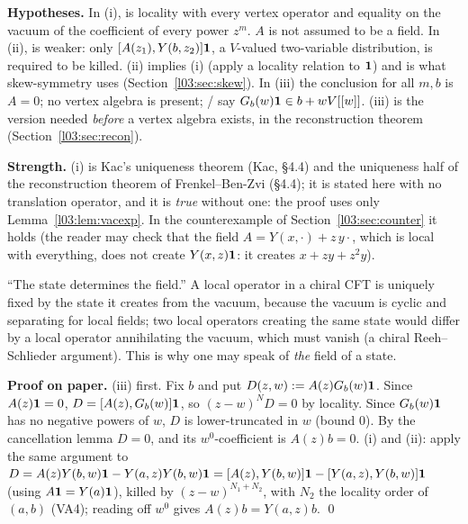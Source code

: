 \begin{dictionary}
\textbf{Hypotheses.} In (i),  is locality with every vertex operator and 
equality on the vacuum of the coefficient of every power $z^m$. $A$ is not assumed to be a field. In
(ii),  is weaker: only $[A(z_1),Y(b,z_2)]\mathbf{1}$, a $V$-valued two-variable distribution,
is required to be killed. (ii) implies (i) (apply a locality relation to $\mathbf{1}$) and is what
skew-symmetry uses (Section~\ref{l03:sec:skew}). In (iii) the conclusion  for all
$m,b$ is $A = 0$; no vertex algebra is present; / say $G_b(w)\mathbf{1}\in
b+wV[[w]]$. (iii) is the version needed \emph{before} a vertex algebra exists, in the reconstruction
theorem (Section~\ref{l03:sec:recon}).

\textbf{Strength.} (i) is Kac's uniqueness theorem (Kac, §4.4) and the uniqueness half of the
reconstruction theorem of Frenkel--Ben-Zvi (§4.4); it is stated here with no translation operator, and it is \emph{true} without one:
the proof uses only Lemma~\ref{l03:lem:vacexp}. In the counterexample of
Section~\ref{l03:sec:counter} it holds (the reader may check that the field $A = Y(x,\cdot)+z\,y\cdot{}$,
which is local with everything, does not create $Y(x,z)\mathbf{1}$: it creates $x+zy+z^2y$).
\end{dictionary}

\begin{physics}
``The state determines the field.'' A local operator in a chiral CFT is uniquely fixed by the state
it creates from the vacuum, because the vacuum is cyclic and separating for local fields; two
local operators creating the same state would differ by a local operator annihilating the vacuum,
which must vanish (a chiral Reeh--Schlieder argument). This is why one may speak of \emph{the} field
of a state.
\end{physics}

\textbf{Proof on paper.} (iii) first. Fix $b$ and put $D(z,w) := A(z)G_b(w)\mathbf{1}$. Since
$A(z)\mathbf{1} = 0$, $D = [A(z),G_b(w)]\mathbf{1}$, so $(z-w)^ND = 0$ by locality. Since
$G_b(w)\mathbf{1}$ has no negative powers of $w$, $D$ is lower-truncated in $w$ (bound $0$). By the
cancellation lemma $D = 0$, and its $w^0$-coefficient is $A(z)b = 0$. (i) and (ii): apply the same
argument to $D = A(z)Y(b,w)\mathbf{1} - Y(a,z)Y(b,w)\mathbf{1} = [A(z),Y(b,w)]\mathbf{1} -
[Y(a,z),Y(b,w)]\mathbf{1}$ (using $A\mathbf{1} = Y(a)\mathbf{1}$), killed by $(z-w)^{N_1+N_2}$, with $N_2$ the
locality order of $(a,b)$ (VA4); reading off $w^0$ gives $A(z)b = Y(a,z)b$. \qed

